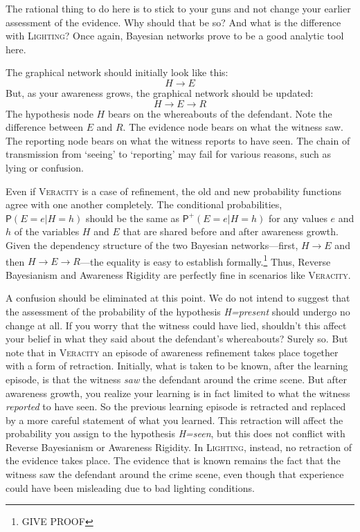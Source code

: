 \documentclass[
  11pt,
  dvipsnames,enabledeprecatedfontcommands]{scrartcl}
\newcommand{\pr}[1]{\ensuremath{\mathsf{P}(#1)}}
\newcommand{\ppr}[2]{\ensuremath{\mathsf{P}^{#1}(#2)}}
\begin{document}
\noindent   The rational thing to do here is to stick to your guns and
not change your earlier assessment of the evidence. Why should that be
so? And what is the difference with \textsc{Lighting}? Once again,
Bayesian networks prove to be a good analytic tool here.

The graphical network should initially look like this:
\[H\rightarrow E\] But, as your awareness grows, the graphical network
should be updated: \[H\rightarrow E \rightarrow R\] The hypothesis node
\(H\) bears on the whereabouts of the defendant. Note the difference
between \(E\) and \(R\). The evidence node bears on what the witness
saw. The reporting node bears on what the witness reports to have seen.
The chain of transmission from `seeing' to `reporting' may fail for
various reasons, such as lying or confusion.

Even if \textsc{Veracity} is a case of refinement, the old and new
probability functions agree with one another completely. The conditional
probabilities, \(\pr{E=e \vert H=h}\) should be the same as
\(\ppr{+}{E=e \vert H=h}\) for any values \(e\) and \(h\) of the
variables \(H\) and \(E\) that are shared before and after awareness
growth. Given the dependency structure of the two Bayesian
networks---first, \(H\rightarrow E\) and then
\(H\rightarrow E \rightarrow R\)---the equality is easy to establish
formally.\footnote{GIVE PROOF} Thus, Reverse Bayesianism and Awareness
Rigidity are perfectly fine in scenarios like \textsc{Veracity}.

A confusion should be eliminated at this point. We do not intend to
suggest that the assessment of the probability of the hypothesis
\textit{H=present} should undergo no change at all. If you worry that
the witness could have lied, shouldn't this affect your belief in what
they said about the defendant's whereabouts? Surely so. But note that in
\textsc{Veracity} an episode of awareness refinement takes place
together with a form of retraction. Initially, what is taken to be
known, after the learning episode, is that the witness \textit{saw} the
defendant around the crime scene. But after awareness growth, you
realize your learning is in fact limited to what the witness
\textit{reported} to have seen. So the previous learning episode is
retracted and replaced by a more careful statement of what you learned.
This retraction will affect the probability you assign to the hypothesis
\textit{H=seen}, but this does not conflict with Reverse Bayesianism or
Awareness Rigidity. In \textsc{Lighting}, instead, no retraction of the
evidence takes place. The evidence that is known remains the fact that
the witness saw the defendant around the crime scene, even though that
experience could have been misleading due to bad lighting conditions.
\end{document}

